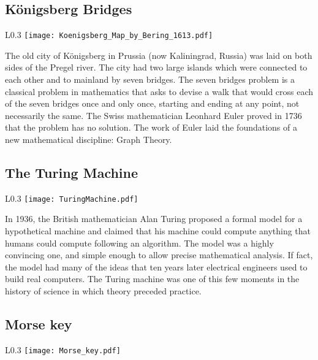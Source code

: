 \subsection* {Königsberg Bridges}

\begin{wrapfigure}{L}{0.3\textwidth}
\centering
\texttt{[image: Koenigsberg\_Map\_by\_Bering\_1613.pdf]}
\end{wrapfigure}

The old city of Königsberg in Prussia (now Kaliningrad, Russia) was laid on both sides of the Pregel river. The city had two large islands which were connected to each other and to mainland by seven bridges. The seven bridges problem is a classical problem in mathematics that asks to devise a walk that would cross each of the seven bridges once and only once, starting and ending at any point, not necessarily the same. The Swiss mathematician Leonhard Euler proved in 1736 that the problem has no solution. The work of Euler laid the foundations of a new mathematical discipline: Graph Theory.

\subsection* {The Turing Machine}

\begin{wrapfigure}{L}{0.3\textwidth}
\centering
\texttt{[image: TuringMachine.pdf]}
\end{wrapfigure}

In 1936, the British mathematician Alan Turing proposed a formal model for a hypothetical machine and claimed that his machine could compute anything that humans could compute following an algorithm. The model was a highly convincing one, and simple enough to allow precise mathematical analysis. If fact, the model had many of the ideas that ten years later electrical engineers used to build real computers. The Turing machine was one of this few moments in the history of science in which theory preceded practice.

\newpage

\subsection* {Morse key}

\begin{wrapfigure}{L}{0.3\textwidth}
\centering
\texttt{[image: Morse\_key.pdf]}
\end{wrapfigure}

